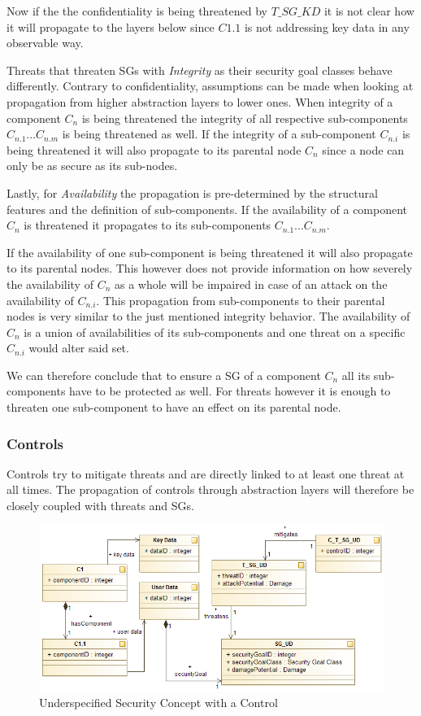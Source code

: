 Now if the the confidentiality is being threatened by $T\_SG\_KD$ it is not clear how it will propagate to the layers below since $C1.1$ is not addressing key data in any observable way. 

Threats that threaten SGs with \textit{Integrity} as their security goal classes behave differently. Contrary to confidentiality, assumptions can be made when looking at propagation from higher abstraction layers to lower ones. When integrity of a component $C_n$ is being threatened the integrity of all respective sub-components $C_{n.1} ... C_{n.m}$ is being threatened as well. If the integrity of a sub-component $C_{n.i}$ is being threatened it will also propagate to its parental node $C_n$ since a node can only be as secure as its sub-nodes.

Lastly, for \textit{Availability} the propagation is pre-determined by the structural features and the definition of sub-components. If the availability of a component $C_n$ is threatened it propagates to its sub-components $C_{n.1} ... C_{n.m}$. 

If the availability of one sub-component is being threatened it will also propagate to its parental nodes. This however does not provide information on how severely the availability of $C_n$ as a whole will be impaired in case of an attack on the availability of $C_{n.i}$. This propagation from sub-components to their parental nodes is very similar to the just mentioned integrity behavior. The availability of $C_n$ is a union of availabilities of its sub-components and one threat on a specific $C_{n.i}$ would alter said set.

We can therefore conclude that to ensure a SG of a component $C_n$ all its sub-components have to be protected as well. For threats however it is enough to threaten one sub-component to have an effect on its parental node.

\subsubsection*{Controls}

Controls try to mitigate threats and are directly linked to at least one threat at all times. The propagation of controls through abstraction layers will therefore be closely coupled with threats and SGs.

\begin{figure}[H]
\centering
\includegraphics[width=\textwidth]{pictures/control_propagation.png}
\caption{Underspecified Security Concept with a Control}
\label{fig:control_propagation}
\end{figure} 

